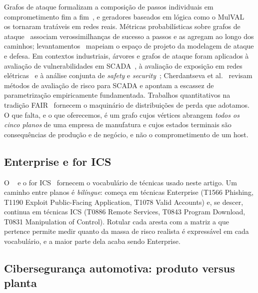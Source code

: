 Grafos de ataque formalizam a composição de passos individuais em
comprometimento fim a fim~\cite{phillips1998graph,sheyner2002automated}, e
geradores baseados em lógica como o MulVAL~\cite{ou2005mulval} os tornaram
tratáveis em redes reais. Métricas probabilísticas sobre grafos de
ataque~\cite{wang2008attack} associam verossimilhanças de sucesso a passos e as
agregam ao longo dos caminhos;
levantamentos~\cite{kordy2014dag,lallie2020review,zenitani2023attack} mapeiam o
espaço de projeto da modelagem de ataque e defesa. Em contextos industriais,
árvores e grafos de ataque foram aplicados à avaliação de vulnerabilidades em
SCADA~\cite{byres2004attack,ten2008vulnerability}, à avaliação de exposição em
redes elétricas~\cite{hahn2011cyber} e à análise conjunta de \emph{safety} e
\emph{security}~\cite{kriaa2015survey}; Cherdantseva et
al.~\cite{cherdantseva2016review} revisam métodos de avaliação de risco para
SCADA e apontam a escassez de parametrização empiricamente fundamentada.
Trabalhos quantitativos na tradição FAIR~\cite{freund2014fair,hubbard2016measure}
fornecem o maquinário de distribuições de perda que adotamos. O que falta, e o
que oferecemos, é um grafo cujos vértices abrangem \emph{todos os cinco planos}
de uma empresa de manufatura e cujos estados terminais são consequências de
produção e de negócio, e não o comprometimento de um host.

\subsection{\attck{} Enterprise e \attck{} for ICS}

O \attck{}~\cite{strom2018attack} e o \attck{} for
ICS~\cite{alexander2020icsattack} fornecem o vocabulário de técnicas usado neste
artigo. Um caminho entre planos é \emph{bilíngue}: começa em
técnicas Enterprise (T1566 Phishing, T1190 Exploit Public-Facing Application,
T1078 Valid Accounts) e, se descer, continua em técnicas ICS (T0886 Remote
Services, T0843 Program Download, T0831 Manipulation of Control). Rotular cada
aresta com a matriz a que pertence permite medir quanto da massa de risco
realista é expressável em cada vocabulário, e a maior parte dela acaba sendo
Enterprise.

\subsection{Cibersegurança automotiva: produto versus planta}

